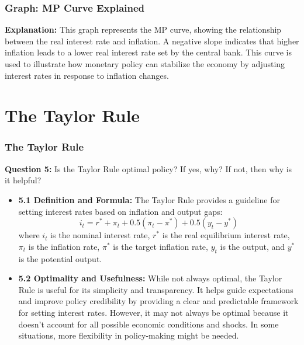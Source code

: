 \documentclass{beamer}
\begin{document}
\begin{frame}
    \frametitle{Graph: MP Curve Explained}
\textbf{Explanation:} This graph represents the MP curve, showing the relationship between the real interest rate and inflation. A negative slope indicates that higher inflation leads to a lower real interest rate set by the central bank. This curve is used to illustrate how monetary policy can stabilize the economy by adjusting interest rates in response to inflation changes.
\end{frame}
    
\section{The Taylor Rule}
\begin{frame}
    \frametitle{The Taylor Rule}
    \textbf{Question 5:} Is the Taylor Rule optimal policy? If yes, why? If not, then why is it helpful?
    \begin{itemize}
        \item \textbf{5.1 Definition and Formula:} The Taylor Rule provides a guideline for setting interest rates based on inflation and output gaps:
        \begin{equation*}
            i_t = r^* + \pi_t + 0.5(\pi_t - \pi^*) + 0.5(y_t - y^*)
        \end{equation*}
        where \(i_t\) is the nominal interest rate, \(r^*\) is the real equilibrium interest rate, \(\pi_t\) is the inflation rate, \(\pi^*\) is the target inflation rate, \(y_t\) is the output, and \(y^*\) is the potential output.
        \item \textbf{5.2 Optimality and Usefulness:} While not always optimal, the Taylor Rule is useful for its simplicity and transparency. It helps guide expectations and improve policy credibility by providing a clear and predictable framework for setting interest rates. However, it may not always be optimal because it doesn't account for all possible economic conditions and shocks. In some situations, more flexibility in policy-making might be needed.
    \end{itemize}
\end{frame}
\end{document}
